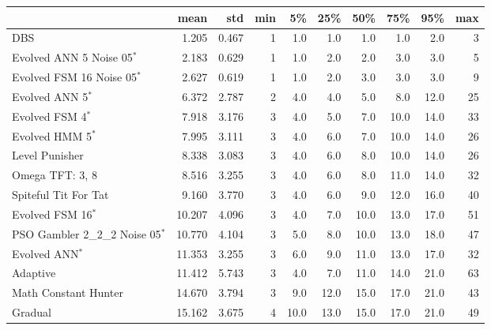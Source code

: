 \begin{tabular}{lrrrrrrrrr}
\toprule
{} &    mean &    std &  min &    5\% &   25\% &   50\% &   75\% &   95\% &  max \\
\midrule
DBS                              &   1.205 &  0.467 &    1 &   1.0 &   1.0 &   1.0 &   1.0 &   2.0 &    3 \\
Evolved ANN 5 Noise 05$^{*}$     &   2.183 &  0.629 &    1 &   1.0 &   2.0 &   2.0 &   3.0 &   3.0 &    5 \\
Evolved FSM 16 Noise 05$^{*}$    &   2.627 &  0.619 &    1 &   1.0 &   2.0 &   3.0 &   3.0 &   3.0 &    9 \\
Evolved ANN 5$^{*}$              &   6.372 &  2.787 &    2 &   4.0 &   4.0 &   5.0 &   8.0 &  12.0 &   25 \\
Evolved FSM 4$^{*}$              &   7.918 &  3.176 &    3 &   4.0 &   5.0 &   7.0 &  10.0 &  14.0 &   33 \\
Evolved HMM 5$^{*}$              &   7.995 &  3.111 &    3 &   4.0 &   6.0 &   7.0 &  10.0 &  14.0 &   26 \\
Level Punisher                   &   8.338 &  3.083 &    3 &   4.0 &   6.0 &   8.0 &  10.0 &  14.0 &   26 \\
Omega TFT: 3, 8                  &   8.516 &  3.255 &    3 &   4.0 &   6.0 &   8.0 &  11.0 &  14.0 &   32 \\
Spiteful Tit For Tat             &   9.160 &  3.770 &    3 &   4.0 &   6.0 &   9.0 &  12.0 &  16.0 &   40 \\
Evolved FSM 16$^{*}$             &  10.207 &  4.096 &    3 &   4.0 &   7.0 &  10.0 &  13.0 &  17.0 &   51 \\
PSO Gambler 2\_2\_2 Noise 05$^{*}$ &  10.770 &  4.104 &    3 &   5.0 &   8.0 &  10.0 &  13.0 &  18.0 &   47 \\
Evolved ANN$^{*}$                &  11.353 &  3.255 &    3 &   6.0 &   9.0 &  11.0 &  13.0 &  17.0 &   32 \\
Adaptive                         &  11.412 &  5.743 &    3 &   4.0 &   7.0 &  11.0 &  14.0 &  21.0 &   63 \\
Math Constant Hunter             &  14.670 &  3.794 &    3 &   9.0 &  12.0 &  15.0 &  17.0 &  21.0 &   43 \\
Gradual                          &  15.162 &  3.675 &    4 &  10.0 &  13.0 &  15.0 &  17.0 &  21.0 &   49 \\
\bottomrule
\end{tabular}
